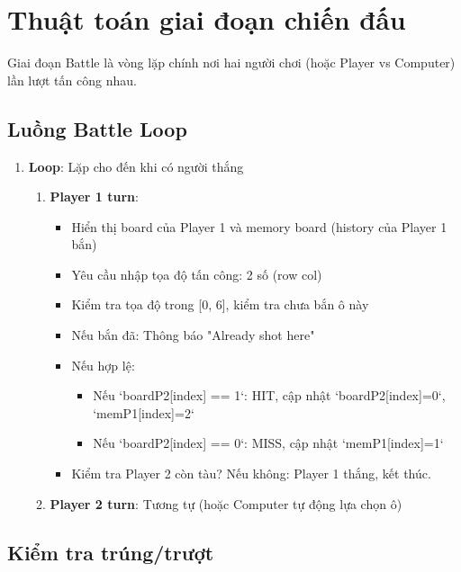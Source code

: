 
\section{Thuật toán giai đoạn chiến đấu}

Giai đoạn Battle là vòng lặp chính nơi hai người chơi (hoặc Player vs Computer) lần lượt tấn công nhau.

\subsection{Luồng Battle Loop}

\begin{enumerate}
    \item \textbf{Loop}: Lặp cho đến khi có người thắng
    \begin{enumerate}
        \item \textbf{Player 1 turn}:
        \begin{itemize}
            \item Hiển thị board của Player 1 và memory board (history của Player 1 bắn)
            \item Yêu cầu nhập tọa độ tấn công: 2 số (row col)
            \item Kiểm tra tọa độ trong [0, 6], kiểm tra chưa bắn ô này
            \item Nếu bắn đã: Thông báo "Already shot here"
            \item Nếu hợp lệ:
            \begin{itemize}
                \item Nếu `boardP2[index] == 1`: HIT, cập nhật `boardP2[index]=0`, `memP1[index]=2`
                \item Nếu `boardP2[index] == 0`: MISS, cập nhật `memP1[index]=1`
            \end{itemize}
            \item Kiểm tra Player 2 còn tàu? Nếu không: Player 1 thắng, kết thúc.
        \end{itemize}
        
        \item \textbf{Player 2 turn}: Tương tự (hoặc Computer tự động lựa chọn ô)
    \end{enumerate}
\end{enumerate}

\subsection{Kiểm tra trúng/trượt}


